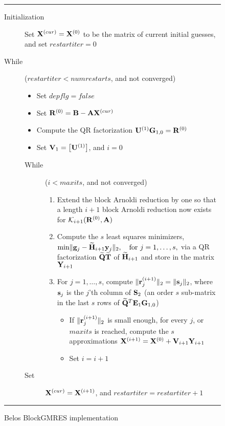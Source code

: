 \documentclass{article}
\newcommand{\bA}{{\bf A}}
\newcommand{\bB}{{\bf B}}
\newcommand{\bE}{{\bf E}}
\newcommand{\bG}{{\bf G}}
\newcommand{\bH}{{\bf H}}
\newcommand{\bQ}{{\bf Q}}
\newcommand{\bR}{{\bf R}}
\newcommand{\bS}{{\bf S}}
\newcommand{\bT}{{\bf T}}
\newcommand{\bU}{{\bf U}}
\newcommand{\bV}{{\bf V}}
\newcommand{\bX}{{\bf X}}
\newcommand{\bY}{{\bf Y}}
\newcommand{\by}{{\bf y}}
\newcommand{\br}{{\bf r}}
\newcommand{\bs}{{\bf s}}
\begin{document}
{\small
\begin{figure}[hbt]
\vspace{.05in} \hrule \vspace{.1in}
\begin{description}
\item[Initialization]
Set $ \bX^{(cur)} = \bX^{(0)}$ to be the  matrix of current
initial guesses, and set $restartiter=0$
\item[While] ($restartiter < numrestarts$, and not converged)
\begin{itemize}
\item Set $depflg = false$
\item Set $\bR^{(0)} = \bB - \bA \bX^{(cur)}$
\item Compute the QR factorization $\bU^{(1)} \bG_{1,0} =
\bR^{(0)}$
\item Set $\bV_1 = \left[ \bU^{(1)} \right]$, and $i=0$
\end{itemize}
\begin{description}
\item [While] ($i < maxits$, and not converged)
\begin{enumerate}
\item  Extend the block Arnoldi reduction by one so that a
length $i+1$ block Arnoldi reduction now exists for ${\cal
K}_{i+1}(\bR^{(0)}, \bA)$

\item Compute the $s$ least squares minimizers,\\
${\rm min}\| {\bf g}_j - \widetilde{\bH}_{i+1} \by_j \|_2, \quad
{\rm for}~ j = 1, \ldots, s, $  via a QR factorization
$\widetilde{\bQ} \widetilde{\bT}$ of $\widetilde{\bH}_{i+1}$ and
store in the matrix $\bY_{i+1}$

\item For $j = 1,\ldots, s$, compute $\| \br_j^{(i+1)} \|_2 = \| \bs_j \|_2$, where
$\bs_j$ is the $j$'th column of $\bS_2$ (an order $s$ sub-matrix
in the last $s$ rows of $\widetilde{\bQ}^T \bE_1 \bG_{1,0}$)

\begin{itemize}
\item If $\| \br_j^{(i+1)} \|_2 $ is small enough, for every $j$, or $maxits$ is reached,
compute the $s$ approximations $\bX^{(i+1)} = \bX^{(0)} +
\bV_{i+1} \bY_{i+1}$
\item Set $i = i+1$
\end{itemize}

\end{enumerate}

\item [Set] $\bX^{(cur)} = \bX^{(i+1)}$, and $restartiter =
restartiter + 1$
\end{description}

\end{description}
\vspace{.1in} \hrule \caption{Belos BlockGMRES implementation}
\label{fig:bGMRES}
\end{figure}
}
\end{document}
